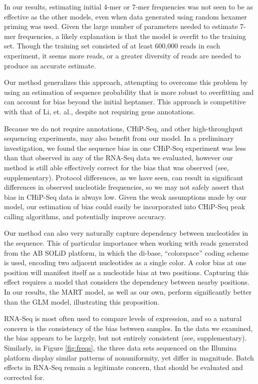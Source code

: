\documentclass{bioinfo}
\begin{document}
In our results, estimating initial 4-mer or 7-mer frequencies was not seen to be
as effective as the other models, even when data generated using random hexamer
priming was used. Given the large number of parameters needed to estimate 7-mer
frequencies, a likely explanation is that the model is overfit to the training
set. Though the training set consisted of at least 600,000 reads in
each experiment, it seems more reads, or a greater diversity of reads are needed
to produce an accurate estimate.

Our method generalizes this approach, attempting to overcome this problem by
using an estimation of sequence probability that is more robust to overfitting
and can account for bias beyond the initial heptamer. This approach is
competitive with that of Li, et. al., despite not requiring gene annotations.

Because we do not require annotations, CHiP-Seq, and other high-throughput
sequencing experiments, may also benefit from our model. In a preliminary
investigation, we found the sequence bias in one CHiP-Seq experiment
\cite{Cao2010} was less than that observed in any of the RNA-Seq data we
evaluated, however our method is still able effectively correct for the bias
that was observed (see, supplementary). Protocol differences, as we have seen,
can result in significant differences in observed nucleotide frequencies, so we
may not safely assert that bias in CHiP-Seq data is always low.  Given the weak
assumptions made by our model, our estimation of bias could easily be
incorporated into CHiP-Seq peak calling algorithms, and potentially improve
accuracy.

Our method can also very naturally capture dependency between nucleotides in the
sequence. This of particular importance when working with reads generated from
the AB SOLiD platform, in which the di-base, ``colorspace'' coding scheme is
used, encoding two adjacent nucleotides as a single color. A color bias at one
position will manifest itself as a nucleotide bias at two positions. Capturing
this effect requires a model that considers the dependency between nearby
positions. In our results, the MART model, as well as our own, perform
significantly better than the GLM model, illustrating this proposition.

RNA-Seq is most often used to compare levels of expression, and so a natural
concern is the consistency of the bias between samples. In the data we examined,
the bias appears to be largely, but not entirely consistent (see,
supplementary). Similarly, in Figure \ref{fig:freqs}, the three data sets
sequenced on the Illumina platform display similar patterns of nonuniformity,
yet differ in magnitude. Batch effects in RNA-Seq remain a legitimate concern,
that should be evaluated and corrected for.




\end{document}
